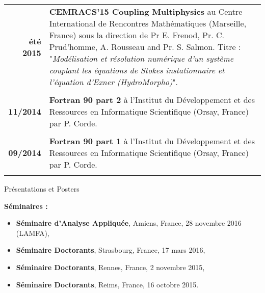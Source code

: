 \documentclass[10pt,a4paper]{report}
\begin{document}
\begin{center}
\begin{tabular}{r p{12cm}}
\textbf{été 2015} & \textbf{CEMRACS'15 Coupling Multiphysics} au Centre International de Rencontres Mathématiques (Marseille, France) sous la direction de Pr E. Frenod, Pr. C. Prud'homme, A. Rousseau and Pr. S. Salmon.\newline
Titre : "\textit{Modélisation et résolution numérique d'un système couplant les équations de Stokes instationnaire et l'équation d'Exner (HydroMorpho)}".\\

& \\

\textbf{11/2014} & \textbf{Fortran 90 part 2} à l'Institut du Développement et des Ressources en Informatique Scientifique (Orsay, France) par P. Corde.\\

& \\

\textbf{09/2014} & \textbf{Fortran 90 part 1} à l'Institut du Développement et des Ressources en Informatique Scientifique (Orsay, France) par P. Corde.\\

& \\

\end{tabular}
\end{center}


\vspace{1.4cm}
\noindent
{\selectfont
\begin{Large}
Présentations et Posters
\end{Large}
\hrulefill
}
\vspace{0.5cm}

\noindent
{\selectfont
\textbf{Séminaires :}
}

\begin{itemize}
\item \textbf{Séminaire d'Analyse Appliquée}, Amiens, France, 28 novembre 2016 (LAMFA),
\item \textbf{Séminaire Doctorants}, Strasbourg, France, 17 mars 2016,
\item \textbf{Séminaire Doctorants}, Rennes, France, 2 novembre 2015,
\item \textbf{Séminaire Doctorants}, Reims, France, 16 octobre 2015.
\end{itemize}
\end{document}
